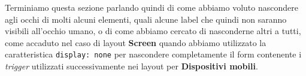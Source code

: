 Terminiamo questa sezione parlando quindi di come abbiamo voluto nascondere
agli occhi di molti alcuni elementi, quali alcune label che quindi non saranno
visibili all'occhio umano, o di come abbiamo cercato di nasconderne altri a
tutti, come accaduto nel caso di layout \textbf{Screen} quando abbiamo
utilizzato la caratteristica \texttt{display: none} per nascondere
completamente il form contenente i \textit{trigger} utilizzati successivamente
nei layout per \textbf{Dispositivi mobili}.
